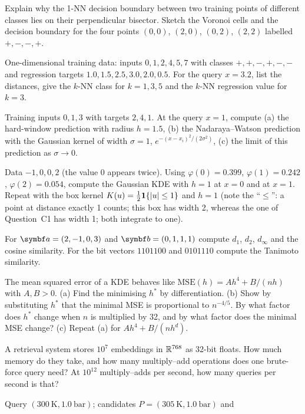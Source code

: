 \documentclass[11pt]{article}
\begin{document}
\begin{questions}
\begin{calculations}
\item Explain why the 1-NN decision boundary between two training points of different classes lies on their
perpendicular bisector. Sketch the Voronoi cells and the decision boundary for the four points $(0,0)$, $(2,0)$,
$(0,2)$, $(2,2)$ labelled $+, -, -, +$.
\item One-dimensional training data: inputs $0, 1, 2, 4, 5, 7$ with classes $+, +, -, +, -, -$ and regression
targets $1.0, 1.5, 2.5, 3.0, 2.0, 0.5$. For the query $x = 3.2$, list the distances, give the $k$-NN class for
$k = 1, 3, 5$ and the $k$-NN regression value for $k = 3$.
\item Training inputs $0, 1, 3$ with targets $2, 4, 1$. At the query $x = 1$, compute (a) the hard-window
prediction with radius $h = 1.5$, (b) the Nadaraya--Watson prediction with the Gaussian kernel
of width $\sigma = 1$, $e^{-(x - x_i)^2/(2\sigma^2)}$, (c) the limit of this prediction as $\sigma \to 0$.
\item Data $-1, 0, 0, 2$ (the value 0 appears twice). Using $\varphi(0) = 0.399$, $\varphi(1) = 0.242$,
$\varphi(2) = 0.054$, compute the Gaussian KDE with $h = 1$ at $x = 0$ and at $x = 1$. Repeat
with the box kernel $K(u) = \frac{1}{2}\mathbf{1}\!\left\{|u| \le 1\right\}$ and $h = 1$ (note the ``$\le$'': a point at distance
exactly 1 counts; this box has width 2, whereas the one of Question~C1 has width 1; both integrate to one).
\item For $\vect{a} = (2, -1, 0, 3)$ and $\vect{b} = (0, 1, 1, 1)$ compute $d_1$, $d_2$, $d_\infty$ and the cosine
similarity. For the bit vectors $1101100$ and $0101110$ compute the Tanimoto similarity.
\item The mean squared error of a KDE behaves like $\mathrm{MSE}(h) = Ah^4 + B/(nh)$ with $A, B > 0$. (a) Find the
minimising $h^*$ by differentiation. (b) Show by substituting $h^*$ that the minimal MSE is proportional to
$n^{-4/5}$. By what factor does $h^*$ change when $n$ is multiplied by 32, and by what factor does the minimal MSE
change? (c) Repeat (a) for $Ah^4 + B/(nh^d)$.
\item A retrieval system stores $10^7$ embeddings in $\mathbb{R}^{768}$ as 32-bit floats. How much memory do they take, and
how many multiply--add operations does one brute-force query need? At $10^{12}$ multiply--adds per second, how many
queries per second is that?
\item Query $(300\ \mathrm{K}, 1.0\ \mathrm{bar})$; candidates $P = (305\ \mathrm{K}, 1.0\ \mathrm{bar})$ and

\end{calculations}
\end{questions}
\end{document}

